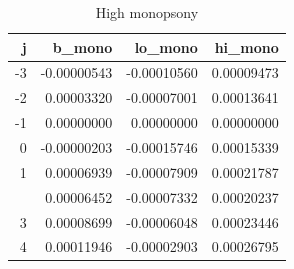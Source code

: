 \begin{table}

\caption{High monopsony}
\centering
\begin{tabular}[t]{rrrr}
\toprule
j & b\_mono & lo\_mono & hi\_mono\\
\midrule
-3 & -0.00000543 & -0.00010560 & 0.00009473\\
-2 & 0.00003320 & -0.00007001 & 0.00013641\\
-1 & 0.00000000 & 0.00000000 & 0.00000000\\
0 & -0.00000203 & -0.00015746 & 0.00015339\\
1 & 0.00006939 & -0.00007909 & 0.00021787\\
\addlinespace
2 & 0.00006452 & -0.00007332 & 0.00020237\\
3 & 0.00008699 & -0.00006048 & 0.00023446\\
4 & 0.00011946 & -0.00002903 & 0.00026795\\
\bottomrule
\end{tabular}
\end{table}

